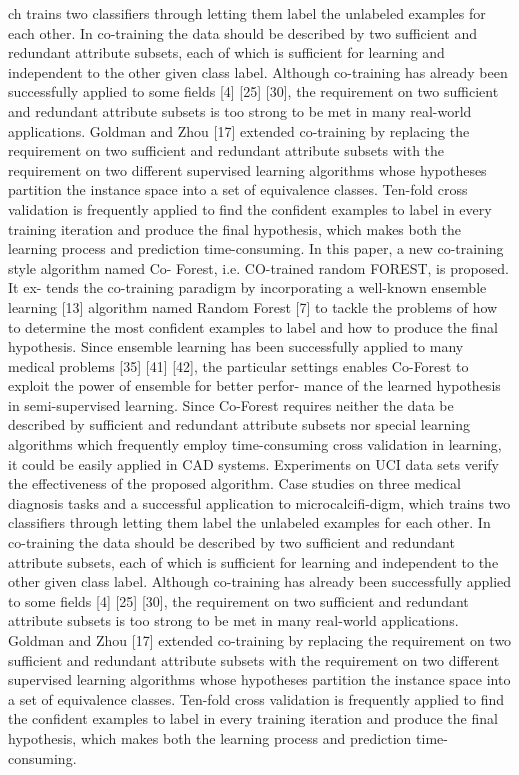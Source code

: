 \documentclass[journal]{IEEEtran}
\begin{document}
ch trains two classifiers through letting them label the unlabeled examples for each other. In co-training the data should be described by two sufficient and redundant attribute subsets, each of which is sufficient for learning and independent to the other given class label.
Although co-training has already been successfully applied to some fields [4] [25] [30], the requirement on two sufficient and redundant attribute subsets is too strong to be met in many real-world applications. Goldman and Zhou [17] extended co-training by replacing the requirement on two sufficient and redundant attribute subsets with the requirement on two different supervised learning algorithms whose hypotheses partition the instance space into a set of equivalence classes. Ten-fold cross validation is frequently applied to find the confident examples to label in every training iteration and produce the final hypothesis, which makes both the learning process and prediction time-consuming.
In this paper, a new co-training style algorithm named Co- Forest, i.e. CO-trained random FOREST, is proposed. It ex- tends the co-training paradigm by incorporating a well-known ensemble learning [13] algorithm named Random Forest [7] to tackle the problems of how to determine the most confident examples to label and how to produce the final hypothesis. Since ensemble learning has been successfully applied to many medical problems [35] [41] [42], the particular settings enables Co-Forest to exploit the power of ensemble for better perfor- mance of the learned hypothesis in semi-supervised learning. Since Co-Forest requires neither the data be described by sufficient and redundant attribute subsets nor special learning algorithms which frequently employ time-consuming cross validation in learning, it could be easily applied in CAD systems. Experiments on UCI data sets verify the effectiveness of the proposed algorithm. Case studies on three medical diagnosis tasks and a successful application to microcalcifi-digm, which trains two classifiers through letting them label the unlabeled examples for each other. In co-training the data should be described by two sufficient and redundant attribute subsets, each of which is sufficient for learning and independent to the other given class label.
Although co-training has already been successfully applied to some fields [4] [25] [30], the requirement on two sufficient and redundant attribute subsets is too strong to be met in many real-world applications. Goldman and Zhou [17] extended co-training by replacing the requirement on two sufficient and redundant attribute subsets with the requirement on two different supervised learning algorithms whose hypotheses partition the instance space into a set of equivalence classes. Ten-fold cross validation is frequently applied to find the confident examples to label in every training iteration and produce the final hypothesis, which makes both the learning process and prediction time-consuming.
\end{document}
